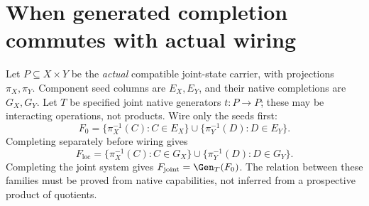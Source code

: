 \section{When generated completion commutes with actual wiring}\label{sec:wiring}
Let $P\subseteq X\times Y$ be the \emph{actual} compatible joint-state
carrier, with projections $\pi_X,\pi_Y$. Component seed columns are
$E_X,E_Y$, and their native completions are $G_X,G_Y$.
Let $T$ be specified joint native generators $t:P\to P$; these may
be interacting operations, not products. Wire only the seeds first:
\[
 F_0=\{\pi_X^{-1}(C):C\in E_X\}
       \cup\{\pi_Y^{-1}(D):D\in E_Y\}.
\]
Completing separately before wiring gives
\[
 F_{\mathrm{loc}}=\{\pi_X^{-1}(C):C\in G_X\}
       \cup\{\pi_Y^{-1}(D):D\in G_Y\}.
\]
Completing the joint system gives $F_{\mathrm{joint}}=\Gen_T(F_0)$.
The relation between these families must be proved from native
capabilities, not inferred from a prospective product of quotients.

